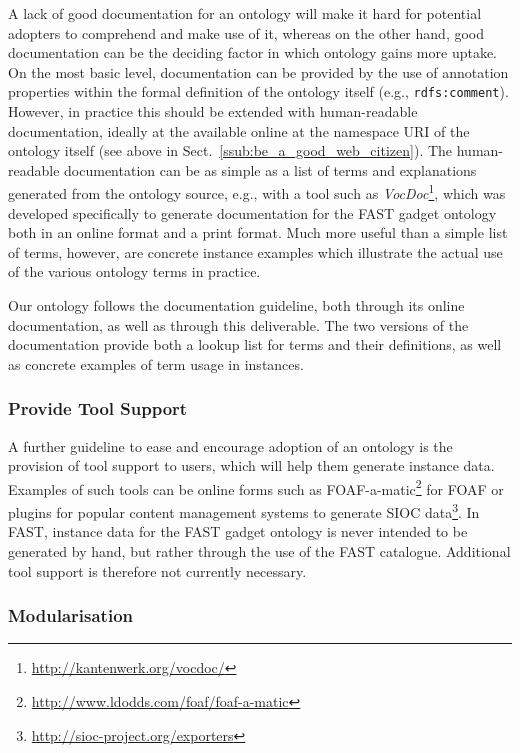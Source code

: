 \documentclass{article}
\begin{document}
A lack of good documentation for an ontology will make it hard for potential adopters to comprehend and make use of it, whereas on the other hand, good documentation can be the deciding factor in which ontology gains more uptake. On the most basic level, documentation can be provided by the use of annotation properties within the formal definition of the ontology itself (e.g., \texttt{rdfs:comment}). However, in practice this should be extended with human-readable documentation, ideally at the available online at the namespace URI of the ontology itself (see above in Sect.~\ref{ssub:be_a_good_web_citizen}). The human-readable documentation can be as simple as a list of terms and explanations generated from the ontology source, e.g., with a tool such as \emph{VocDoc}\footnote{\url{http://kantenwerk.org/vocdoc/}}, which was developed specifically to generate documentation for the FAST gadget ontology both in an online format and a print format. Much more useful than a simple list of terms, however, are concrete instance examples which illustrate the actual use of the various ontology terms in practice.

Our ontology follows the documentation guideline, both through its online documentation, as well as through this deliverable. The two versions of the documentation provide both a lookup list for terms and their definitions, as well as concrete examples of term usage in instances.


\subsubsection{Provide Tool Support} %
\label{ssub:provide_tool_support}

A further guideline to ease and encourage adoption of an ontology is the provision of tool support to users, which will help them generate instance data. Examples of such tools can be online forms such as FOAF-a-matic\footnote{\url{http://www.ldodds.com/foaf/foaf-a-matic}} for FOAF or plugins for popular content management systems to generate SIOC data\footnote{\url{http://sioc-project.org/exporters}}. In FAST, instance data for the FAST gadget ontology is never intended to be generated by hand, but rather through the use of the FAST catalogue. Additional tool support is therefore not currently necessary.


\subsubsection{Modularisation} %
\label{ssub:modularisation}
\end{document}
